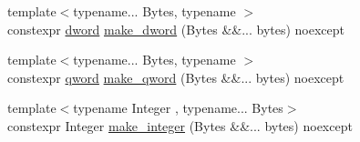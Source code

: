 \begin{DoxyCompactItemize}
\item 
{\footnotesize template$<$typename... Bytes, typename $>$ }\\constexpr \mbox{\hyperlink{namespacedistant_a9fa41a5a1a17dcbd24da1c1855c92489}{dword}} \mbox{\hyperlink{namespacedistant_a0a3f95b6bfb10c1a6c55fb2d33714869}{make\+\_\+dword}} (Bytes \&\&... bytes) noexcept
\item 
{\footnotesize template$<$typename... Bytes, typename $>$ }\\constexpr \mbox{\hyperlink{namespacedistant_ac5f83107c559f04950d4c9fa5464364e}{qword}} \mbox{\hyperlink{namespacedistant_a88307be0e4582f81cd9644ba422bacda}{make\+\_\+qword}} (Bytes \&\&... bytes) noexcept
\item 
{\footnotesize template$<$typename Integer , typename... Bytes$>$ }\\constexpr Integer \mbox{\hyperlink{namespacedistant_a6c4109cf2d298ee058cb32412f7c82ae}{make\+\_\+integer}} (Bytes \&\&... bytes) noexcept
\end{DoxyCompactItemize}
